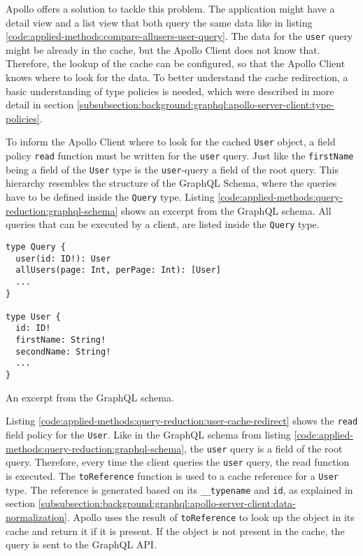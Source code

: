 \noindent Apollo offers a solution to tackle this problem. The application might have a detail view and a list view that both query the same data like in listing \ref{code:applied-methods:compare-allusers-user-query}. The data for the \texttt{user} query might be already in the cache, but the Apollo Client does not know that. Therefore, the lookup of the cache can be configured, so that the Apollo Client knows where to look for the data. To better understand the cache redirection, a basic understanding of type policies is needed, which were described in more detail in section \ref{subsubsection:background:graphql:apollo-server-client:type-policies}.

\bigskip

\noindent To inform the Apollo Client where to look for the cached \texttt{User} object, a field policy \texttt{read} function must be written for the \texttt{user} query. Just like the \texttt{firstName} being a field of the \texttt{User} type is the \texttt{user}-query a field of the root query. This hierarchy resembles the structure of the GraphQL Schema, where the queries have to be defined inside the \texttt{Query} type. Listing \ref{code:applied-methods:query-reduction:graphql-schema} shows an excerpt from the GraphQL schema. All queries that can be executed by a client, are listed inside the \texttt{Query} type.

\ifshowListings
\begin{listing}[H]
\begin{verbatim}
type Query {
  user(id: ID!): User
  allUsers(page: Int, perPage: Int): [User]
  ...
}

type User {
  id: ID!
  firstName: String!
  secondName: String!
  ...
}
\end{verbatim}
\caption{An excerpt from the GraphQL schema.}\label{code:applied-methods:query-reduction:graphql-schema}
\end{listing}
\fi


\noindent Listing \ref{code:applied-methods:query-reduction:user-cache-redirect} shows the \texttt{read} field policy for the \texttt{User}. Like in the GraphQL schema from listing \ref{code:applied-methods:query-reduction:graphql-schema}, the \texttt{user} query is a field of the root query. Therefore, every time the client queries the \texttt{user} query, the read function is executed. The \texttt{toReference} function is used to a cache reference for a \texttt{User} type. The reference is generated based on its \texttt{\_\_typename} and \texttt{id}, as explained in section \ref{subsubsection:background:graphql:apollo-server-client:data-normalization}. Apollo uses the result of \texttt{toReference} to look up the object in its cache and return it if it is present. If the object is not present in the cache, the query is sent to the GraphQL \ac{API}.

